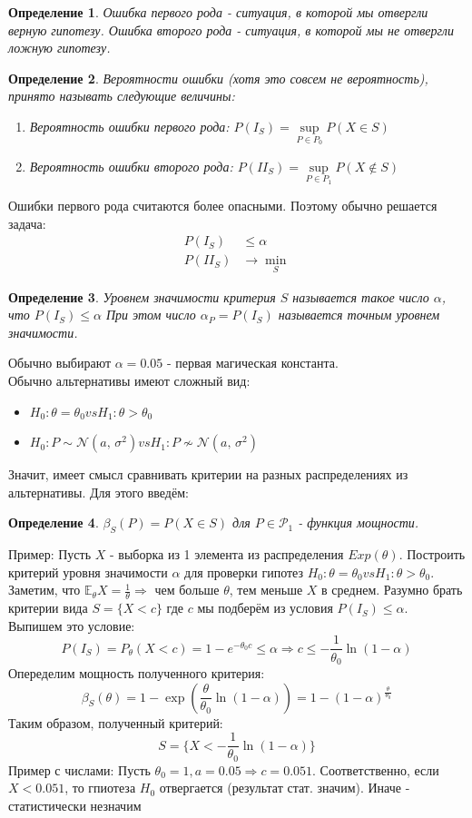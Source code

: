 \documentclass[a4paper,12pt]{article}
\newcommand{\expec}{\mathbb{E}}
\newcommand{\normal}[2]{\mathcal{N}(#1,\,#2)}
\newtheorem{dfn}{Определение}[section]
\theoremstyle{named}
\begin{document}
\begin{dfn}
Ошибка первого рода - ситуация, в которой мы отвергли верную гипотезу. Ошибка второго рода - 
ситуация, в которой мы не отвергли ложную гипотезу.
\end{dfn}
\begin{dfn}
    Вероятности ошибки (хотя это совсем не вероятность), принято называть следующие величины:
    \begin{enumerate}
        \item Вероятность ошибки первого рода: $P(I_S) = \sup\limits_{P\in P_0} P(X\in S)$
        \item Вероятность ошибки второго рода: $P(II_S) = \sup\limits_{P\in P_1} P(X\not \in S)$
    \end{enumerate}
    \end{dfn}    
Ошибки первого рода считаются более опасными. Поэтому обычно решается задача:
\begin{equation}
    \begin{split}
        P(I_S) &\leq \alpha \\    
        P(I\!I_S) &\to \min_S
    \end{split}
\end{equation}
\begin{dfn}
    Уровнем значимости критерия $S$ называется такое число $\alpha$, что  $P(I_S) \leq \alpha$
    При этом число $\alpha_P = P(I_S)$ называется точным уровнем значимости. 
\end{dfn}
Обычно выбирают $\alpha = 0.05$ - первая магическая константа.  \\
Обычно альтернативы имеют сложный вид:
\begin{itemize}
    \item $H_0: \theta = \theta_0 vs H_1: \theta > \theta_0$
    \item $H_0: P \sim \normal{a}{\sigma^2}  vs H_1: P \not\sim \normal{a}{\sigma^2}$
\end{itemize}
Значит, имеет смысл сравнивать критерии на разных распределениях из альтернативы. Для этого введём:
\begin{dfn}
    $\beta_S(P) = P(X\in S)$ для $P \in \mathcal{P}_1$ - функция мощности. 
\end{dfn}
Пример: Пусть $X$ - выборка из 1 элемента из распределения $Exp(\theta)$. Построить критерий 
уровня значимости $\alpha$ для проверки гипотез $H_0: \theta = \theta_0 vs H_1: \theta > \theta_0$. Заметим, что 
$\expec_\theta X = \frac{1}{\theta} \Rightarrow$ чем больше $\theta$, тем меньше $X$ в среднем. Разумно брать 
критерии вида $S = \{ X < c \}$ где $c$ мы подберём из условия $P(I_S) \leq \alpha$. Выпишем это условие:
$$
    P(I_S) = P_\theta(X < c) = 1 - e^{-\theta_0 c} \leq \alpha \Rightarrow c\leq -\frac{1}{\theta_0}\ln(1-\alpha)
$$
Опеределим мощность полученного критерия:
$$
    \beta_S(\theta) = 1 - \exp(\frac{\theta}{\theta_0}\ln(1-\alpha)) = 1 - (1 - \alpha)^{\frac{\theta}{\theta_0}}
$$
Таким образом, полученный критерий:
$$
    S = \{ X < -\frac{1}{\theta_0}\ln(1-\alpha)\}
$$
Пример с числами: Пусть $\theta_0 = 1, a =0.05 \Rightarrow c = 0.051$. Соответственно, если $X < 0.051$, то 
гпиотеза $H_0$ отвергается (результат стат. значим). Иначе - статистически незначим 
\end{document}
